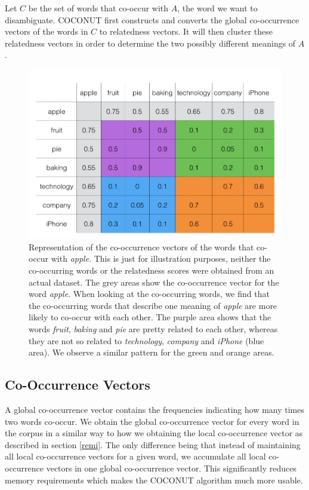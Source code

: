 \documentclass[11pt]{article}
\begin{document}
Let $C$ be the set of words that co-occur with $A$, the word we want to disambiguate. COCONUT first constructs and converts the global co-occurrence vectors of the words in $C$ to relatedness vectors. It will then cluster these relatedness vectors in order to determine the two possibly different meanings of $A$. 
\begin{figure}
\center
	\includegraphics[scale=0.20]{cococ.png}
\caption{Representation of the co-occurrence vectors of the words that co-occur with \textit{apple}. This is just for illustration purposes, neither the co-occurring words or the relatedness scores were obtained from an actual dataset. The grey areas show the co-occurrence vector for the word \textit{apple}. When looking at the co-occurring words, we find that the co-occurring words that describe one meaning of \textit{apple} are more likely to co-occur with each other. The purple area shows that the words \textit{fruit}, \textit{baking} and \textit{pie} are pretty related to each other, whereas they are not so related to \textit{technology}, \textit{company} and \textit{iPhone} (blue area). We observe a similar pattern for the green and orange areas.}
\label{cococ}
\end{figure}

\subsection{Co-Occurrence Vectors}
A global co-occurrence vector contains the frequencies indicating how many times two words co-occur. We obtain the global co-occurrence vector for every word in the corpus in a similar way to how we obtaining the local co-occurrence vector as described in section \ref{remi}. The only difference being that instead of maintaining all local co-occurrence vectors for a given word, we accumulate all local co-occurrence vectors in one global co-occurrence vector. This significantly reduces memory requirements which makes the COCONUT algorithm much more usable. 
\end{document}
